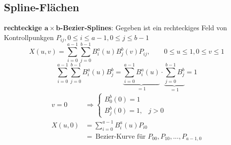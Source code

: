 \subsection{Spline-Flächen}
\Defi \textbf{rechteckige $\boldsymbol{a \times b}$-Bezier-Splines}: Gegeben ist ein rechteckiges Feld von
	Kontrollpunkgen $P_{ij}, 0 \le i \le a-1, 0 \le j \le b-1$
	\[\boxed{X(u,v) = \sum\limits_{i=0}^{a-1}\sum\limits_{j=0}^{b-1}
				B_i^a(u)B_j^b(v) P_{ij}}, \qquad 0 \le u \le 1, 0 \le v \le 1\]
	\[\sum\limits_{i=0}^{a-1}\sum\limits_{j=0}^{b-1}
				B_i^a(u)B_j^b =
				\underbrace{\sum\limits_{i=0}^{a-1} B_i^a(u)}_{= 1} \cdot
				\underbrace{\sum\limits_{j=0}^{b-1}B_j^b}_{= 1} = 1\]
	\begin{align*}
	 v = 0 &\Rightarrow \begin{cases}
	                     B_0^b(0) = 1 \\
	                     B_j^b(0) = 1, & j > 0
	                    \end{cases}\\
	 X(u,0) &= \sum\limits_{i=0}^{a-1} B_i^a(u) P_{i0}\\
		&=\ \text{Bezier-Kurve für $P_{00}, P_{10}, ..., P_{a-1,0}$}
	\end{align*}
